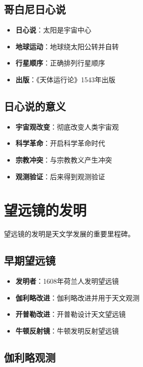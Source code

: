 \documentclass[12pt,UTF8]{ctexbook}
\begin{document}
\subsection{哥白尼日心说}

\begin{itemize}
  \item \textbf{日心说}：太阳是宇宙中心
  \item \textbf{地球运动}：地球绕太阳公转并自转
  \item \textbf{行星顺序}：正确排列行星顺序
  \item \textbf{出版}：《天体运行论》1543年出版
\end{itemize}

\subsection{日心说的意义}

\begin{itemize}
  \item \textbf{宇宙观改变}：彻底改变人类宇宙观
  \item \textbf{科学革命}：开启科学革命时代
  \item \textbf{宗教冲突}：与宗教教义产生冲突
  \item \textbf{观测验证}：后来得到观测验证
\end{itemize}

\section{望远镜的发明}

望远镜的发明是天文学发展的重要里程碑。

\subsection{早期望远镜}

\begin{itemize}
  \item \textbf{发明者}：1608年荷兰人发明望远镜
  \item \textbf{伽利略改进}：伽利略改进并用于天文观测
  \item \textbf{开普勒改进}：开普勒设计天文望远镜
  \item \textbf{牛顿反射镜}：牛顿发明反射望远镜
\end{itemize}

\subsection{伽利略观测}
\end{document}
